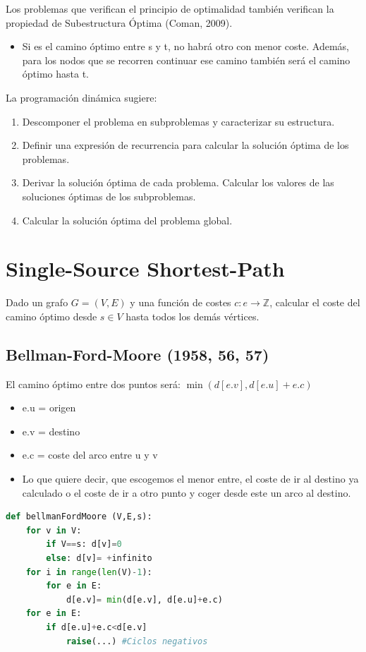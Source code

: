 \documentclass[12pt, twoside, openright]{report} %
\begin{document}
	Los problemas que verifican el principio de optimalidad también
    verifican la propiedad de Subestructura Óptima (Coman, 2009).

    \begin{itemize}
  
    \item
      Si es el camino óptimo entre s y t, no habrá otro con menor coste.
      Además, para los nodos que se recorren continuar ese camino
      también será el camino óptimo hasta t.
    \end{itemize}

	La programación dinámica sugiere:

    \begin{enumerate}  
    \item
      Descomponer el problema en subproblemas y caracterizar su
      estructura.
    \item
      Definir una expresión de recurrencia para calcular la solución
      óptima de los problemas.
    \item
      Derivar la solución óptima de cada problema. Calcular los valores
      de las soluciones óptimas de los subproblemas.
    \item
      Calcular la solución óptima del problema global.
    \end{enumerate}
\pagebreak

\section{Single-Source Shortest-Path}

  
Dado un grafo \(G=(V,E)\) y una función de costes \(c: e → \mathbb{Z}\),
calcular el coste del camino óptimo desde \(s \in V\) hasta todos los
demás vértices.

\subsection{Bellman-Ford-Moore (1958, 56, 57)}

El camino óptimo entre dos puntos será: \(\min (d[e.v], d[e.u]+ e.c)\)

\begin{itemize}
\item
  e.u = origen
\item
  e.v = destino
\item
  e.c = coste del arco entre u y v
\item
    Lo que quiere decir, que escogemos el menor entre, el coste de ir al
    destino ya calculado o el coste de ir a otro punto y coger desde
    este un arco al destino.
\end{itemize}
\begin{lstlisting}[language=Python]
def bellmanFordMoore (V,E,s):
	for v in V:
		if V==s: d[v]=0
		else: d[v]= +infinito
	for i in range(len(V)-1):
		for e in E:
			d[e.v]= min(d[e.v], d[e.u]+e.c)
	for e in E:
		if d[e.u]+e.c<d[e.v]
			raise(...) #Ciclos negativos
\end{lstlisting}
\end{document}
